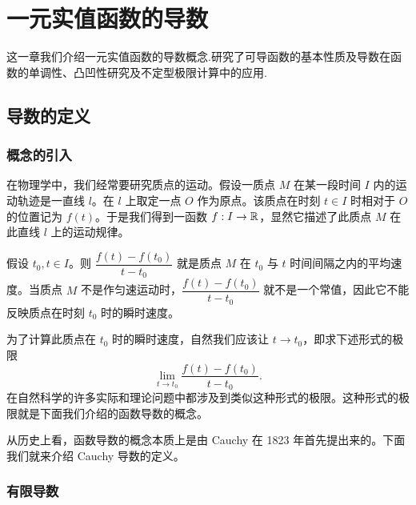 \chapter{一元实值函数的导数}

这一章我们介绍一元实值函数的导数概念.研究了可导函数的基本性质及导数在函数的单调性、凸凹性研究及不定型极限计算中的应用.

\section{导数的定义}

\subsection{概念的引入}
	\label{sec:6-1-1}

在物理学中，我们经常要研究质点的运动。假设一质点 \(M\) 在某一段时间 \(I\) 内的运动轨迹是一直线 \(l\)。在 \(l\) 上取定一点 \(O\) 作为原点。该质点在时刻 \(t\in I\) 时相对于 \(O\) 的位置记为 \(f(t)\)。于是我们得到一函数 \(f:I\to\mathbb{R}\)，显然它描述了此质点 \(M\) 在此直线 \(l\) 上的运动规律。

假设 \(t_0,t\in I\)。则 \(\dfrac{f(t)-f(t_0)}{t-t_0}\) 就是质点 \(M\) 在 \(t_0\) 与 \(t\) 时间间隔之内的平均速度。当质点 \(M\) 不是作匀速运动时，\(\dfrac{f(t)-f(t_0)}{t-t_0}\) 就不是一个常值，因此它不能反映质点在时刻 \(t_0\) 时的瞬时速度。

为了计算此质点在 \(t_0\) 时的瞬时速度，自然我们应该让 \(t\to t_0\)，即求下述形式的极限
\[
\lim_{t\to t_0}\frac{f(t)-f(t_0)}{t-t_0}.
\]
在自然科学的许多实际和理论问题中都涉及到类似这种形式的极限。这种形式的极限就是下面我们介绍的函数导数的概念。

从历史上看，函数导数的概念本质上是由 Cauchy 在 1823 年首先提出来的。下面我们就来介绍 Cauchy 导数的定义。

\subsection{有限导数}
	\label{sec:6-1-2}

